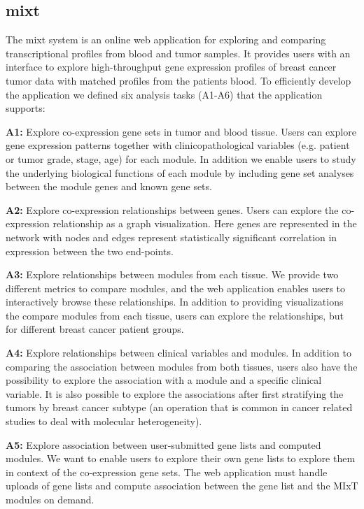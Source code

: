 \subsection{\gls{mixt}}
The \gls{mixt} system is an online web application for exploring and comparing
transcriptional profiles from blood and tumor samples. It provides users with an
interface to explore high-throughput gene expression profiles of breast cancer
tumor data with matched profiles from the patients blood. To efficiently develop
the application we defined six analysis tasks (A1-A6) that the application
supports: 

\textbf{A1:} Explore co-expression gene sets in tumor and blood tissue.  Users
can explore gene expression patterns together with clinicopathological variables
(e.g. patient or tumor grade, stage, age) for each module.  In addition we
enable users to study the underlying biological functions of each module by
including gene set analyses between the module genes and known gene sets. 

\textbf{A2:} Explore co-expression relationships between genes. Users can
explore the co-expression relationship as a graph visualization. 
Here genes are represented in the network with nodes and edges represent 
statistically significant correlation in expression between the two end-points. 

\textbf{A3:} Explore relationships between modules from each tissue. We provide
two different metrics to compare modules, and the web application enables users
to interactively browse these relationships.  In addition to providing
visualizations the compare modules from each tissue, users can explore the
relationships, but for different breast cancer patient groups. 

\textbf{A4:} Explore relationships between clinical variables and modules. In
addition to comparing the association between modules from both tissues, users
also have the possibility to explore the association with a module and a
specific clinical variable. It is also possible to explore the associations
after first stratifying the tumors by breast cancer subtype (an operation that
is common in cancer related studies to deal with molecular heterogeneity).

\textbf{A5:} Explore association between user-submitted gene lists and computed
modules. We want to enable users to explore their own gene lists to explore
them in context of the co-expression gene sets. The web application must handle
uploads of gene lists and compute association between the gene list and the MIxT
modules on demand. 

